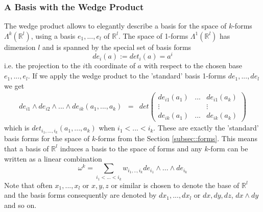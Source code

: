 \subsubsection{A Basis with the Wedge Product}
The wedge product allows to elegantly describe a basis for the space of $k$-forms $\Lambda^k(\mathbb R^l)$, using a basis $e_1,...,e_l$ of $\mathbb R^l$. The space of 1-forms $\Lambda^1(\mathbb R^l)$ has dimension $l$ and is spanned by the special set of basis forms
\[de_i(a) := det_i(a) = a^i\]
i.e. the projection to the $i$th coordinate of $a$ with respect to the chosen base $e_1,...,e_l$.  If we apply the wedge product to the 'standard' basis 1-forms $de_1,..., de_l$ we get
\begin{eqnarray*}de_{i1}\wedge de_{i2} \wedge ... \wedge de_{ik}(a_1,...,a_k) &= &det \begin{pmatrix}
de_{i1}(a_1) &  ... & de_{i1}(a_k) \\
\vdots & & \vdots \\
de_{ik}(a_1) &... & de_{ik}(a_k)
\end{pmatrix} \end{eqnarray*}
which is $det_{i_1,...,i_k}(a_1,...,a_k)$ when $i_1 <...<i_k$. These are exactly the 'standard' basis forms for the space of $k$-forms from the Section \ref{subsec::forms}. This means that a basis of $\mathbb R^l$ induces a basis to the space of forms and any $k$-form can be written as a linear combination 
\[\omega^k = \sum_{i_1<...<i_k} w_{i_1,..,i_k} de_{i_1}\wedge...\wedge de_{i_k} \]
Note that often $x_1,...,x_l$ or $x,y,z$ or similar is chosen to denote the base of $\mathbb R^l$ and the basis forms consequently are denoted by $dx_1,..., dx_l$ or $dx,dy,dz$, $dx \wedge dy$ and so on. 

